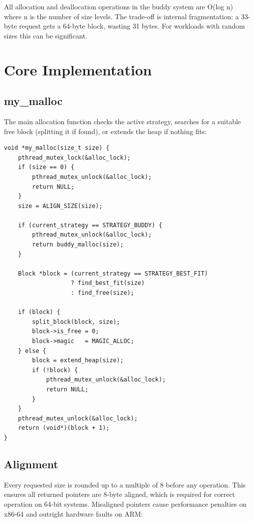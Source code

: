 \documentclass[12pt, a4paper]{report}
\begin{document}
All allocation and deallocation operations in the buddy system are O(log n)
where n is the number of size levels. The trade-off is internal fragmentation: a
33-byte request gets a 64-byte block, wasting 31 bytes. For workloads with
random sizes this can be significant.

\chapter{Core Implementation}

\section{my\_malloc}

The main allocation function checks the active strategy, searches for a suitable
free block (splitting it if found), or extends the heap if nothing fits:

\begin{lstlisting}
void *my_malloc(size_t size) {
    pthread_mutex_lock(&alloc_lock);
    if (size == 0) {
        pthread_mutex_unlock(&alloc_lock);
        return NULL;
    }
    size = ALIGN_SIZE(size);

    if (current_strategy == STRATEGY_BUDDY) {
        pthread_mutex_unlock(&alloc_lock);
        return buddy_malloc(size);
    }

    Block *block = (current_strategy == STRATEGY_BEST_FIT)
                   ? find_best_fit(size)
                   : find_free(size);

    if (block) {
        split_block(block, size);
        block->is_free = 0;
        block->magic   = MAGIC_ALLOC;
    } else {
        block = extend_heap(size);
        if (!block) {
            pthread_mutex_unlock(&alloc_lock);
            return NULL;
        }
    }
    pthread_mutex_unlock(&alloc_lock);
    return (void*)(block + 1);
}
\end{lstlisting}

\section{Alignment}

Every requested size is rounded up to a multiple of 8 before any operation.
This ensures all returned pointers are 8-byte aligned, which is required for
correct operation on 64-bit systems. Misaligned pointers cause performance
penalties on x86-64 and outright hardware faults on ARM:
\end{document}
